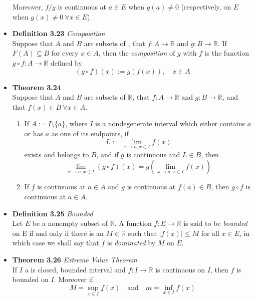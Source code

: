 \documentclass[11pt,a4paper]{article}
\begin{document}
\begin{itemize}
        Moreover, $f/g$ is continuous at $a \in E$ when $g(a) \neq 0$
        (respectively, on $E$ when $g(x) \neq 0\ \forall x \in E$).
    \item \textbf{Definition 3.23} \emph{Composition} \\
        Suppose that $A$ and $B$ are subsets of , that $f : A \to \mathbb{R}$
        and $g : B \to \mathbb{R}$.
        If $F(A) \subseteq B$ for every $x \in A$, then the \emph{composition} of $g$ with $f$
        is the function $g \circ f : A \to \mathbb{R}$ defined by
        \[
            (g \circ f) (x) := g(f(x)), \quad x \in A
        \]
    \item \textbf{Theorem 3.24} \\
        Suppose that $A$ and $B$ are subsets of $\mathbb{R}$, that $f : A \to \mathbb{R}$
        and $g : B \to \mathbb{R}$, and that $f(x) \in B \ \forall x \in A$.
        \begin{enumerate}
            \item If $A := I \setminus \{a\}$, where $I$ is a nondegenerate interval which
                either contains $a$ or has $a$ as one of its endpoints, if
                \[
                    L := \lim_{x \to a; x \in I} f(x)
                \]
                exists and belongs to $B$, and if $g$ is continuous and $L \in B$, then
                \[
                    \lim_{x \to a; x \in I} (g \circ f) (x) =
                    g \left( \lim_{x \to a; x \in I} f(x)\right)
                \]
            \item If $f$ is continuous at $a \in A$ and $g$ is continuous at $f(a) \in B$,
                then $g \circ f$ is continuous at $a \in A$.
        \end{enumerate}
    \item \textbf{Definition 3.25} \emph{Bounded} \\
        Let $E$ be a nonempty subset of $\mathbb{R}$.
        A function $f : E \to \mathbb{R}$ is said to be \emph{bounded} on E if and only if
        there is an $M \in \mathbb{R}$ such that $|f(x)| \leq M$ for all $x \in E$, in
        which case we shall say that $f$ is \emph{dominated} by $M$ on $E$.
    \item \textbf{Theorem 3.26} \emph{Extreme Value Theorem} \\
        If $I$ a is closed, bounded interval and $f : I \to \mathbb{R}$ is continuous on $I$,
        then $f$ is bounded on $I$.
        Moreover if
        \[
            M = \sup_{x \in I} f(x) \quad \text{and} \quad m = \inf_{x \in I} f(x)
\]
\end{itemize}
\end{document}

